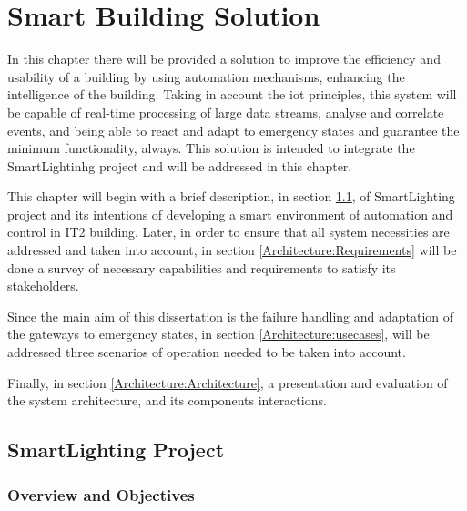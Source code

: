\chapter{Smart Building Solution}
\label{chapter:architecture}

In this chapter there will be provided a solution to improve the efficiency and usability of a building by using automation mechanisms, enhancing the intelligence of the building. Taking in account the \ac{iot} principles, this system will be capable of real-time processing of large data streams, analyse and correlate events, and being able to react and adapt to emergency states and guarantee the minimum functionality, always. This solution is intended to integrate the SmartLightinhg project and will be addressed in this chapter.

This chapter will begin with a brief description, in section \ref{Architecture:slproject}, of SmartLighting project and its intentions of developing a smart environment of automation and control in IT2 building. Later, in order to ensure that all system necessities are addressed and taken into account, in section \ref{Architecture:Requirements} will be done a survey of necessary capabilities and  requirements to satisfy its stakeholders.

Since the main aim of this dissertation is the failure handling and adaptation of the gateways to emergency states, in section \ref{Architecture:usecases}, will be addressed three scenarios of operation needed to be taken into account.

Finally, in section \ref{Architecture:Architecture}, a presentation and evaluation of the system architecture, and its components interactions. 


\newpage

\section{SmartLighting Project}
\label{Architecture:slproject}

\subsection{Overview and Objectives}
\label{Architecture:Overview}

